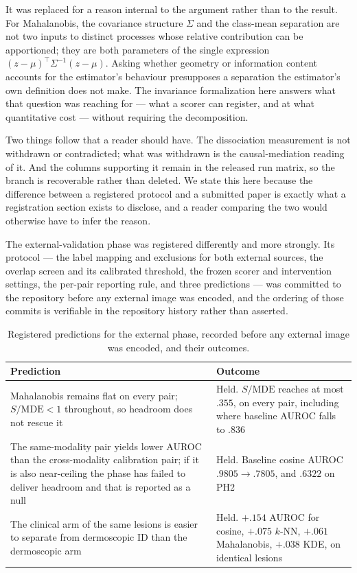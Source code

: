 \documentclass[pdflatex,sn-basic]{sn-jnl}
\theoremstyle{plain}
\theoremstyle{definition}
\theoremstyle{remark}
\begin{document}
It was replaced for a reason internal to the argument rather than to the
result. For Mahalanobis, the covariance structure $\Sigma$ and the class-mean
separation are not two inputs to distinct processes whose relative contribution
can be apportioned; they are both parameters of the single expression
$(z-\mu)^\top\Sigma^{-1}(z-\mu)$. Asking whether geometry or information content
accounts for the estimator's behaviour presupposes a separation the estimator's
own definition does not make. The invariance formalization here answers what
that question was reaching for --- what a scorer can register, and at what
quantitative cost --- without requiring the decomposition.

Two things follow that a reader should have. The dissociation measurement is
not withdrawn or contradicted; what was withdrawn is the causal-mediation
reading of it. And the columns supporting it remain in the released run matrix,
so the branch is recoverable rather than deleted. We state this here because
the difference between a registered protocol and a submitted paper is exactly
what a registration section exists to disclose, and a reader comparing the two
would otherwise have to infer the reason.

The external-validation phase was registered differently and more strongly. Its
protocol --- the label mapping and exclusions for both external sources, the
overlap screen and its calibrated threshold, the frozen scorer and intervention
settings, the per-pair reporting rule, and three predictions --- was committed
to the repository before any external image was encoded, and the ordering of
those commits is verifiable in the repository history rather than asserted.

\begin{table}[t]
\centering
\caption{Registered predictions for the external phase, recorded before any external image was encoded, and their outcomes.}
\label{tab:prereg}
\small
\begin{tabular}{p{5.4cm}p{7.4cm}}
\toprule
Prediction & Outcome\\
\midrule
Mahalanobis remains flat on every pair; $S/\mathrm{MDE}<1$ throughout, so headroom does not rescue it &
Held. $S/\mathrm{MDE}$ reaches at most $.355$, on every pair, including where baseline AUROC falls to $.836$\\
\addlinespace
The same-modality pair yields lower AUROC than the cross-modality calibration pair; if it is also near-ceiling the phase has failed to deliver headroom and that is reported as a null &
Held. Baseline cosine AUROC $.9805\rightarrow.7805$, and $.6322$ on PH2\\
\addlinespace
The clinical arm of the same lesions is easier to separate from dermoscopic ID than the dermoscopic arm &
Held. $+.154$ AUROC for cosine, $+.075$ $k$-NN, $+.061$ Mahalanobis, $+.038$ KDE, on identical lesions\\
\bottomrule
\end{tabular}
\end{table}
\end{document}
